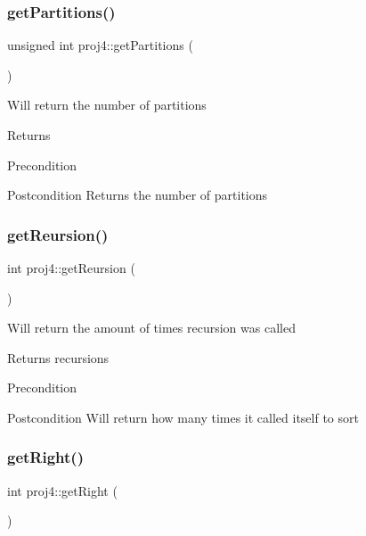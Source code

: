 \subsubsection{\texorpdfstring{get\+Partitions()}{getPartitions()}}
{\footnotesize\ttfamily unsigned int proj4\+::get\+Partitions (\begin{DoxyParamCaption}{ }\end{DoxyParamCaption})}

Will return the number of partitions \begin{DoxyReturn}{Returns}

\end{DoxyReturn}
\begin{DoxyPrecond}{Precondition}

\end{DoxyPrecond}
\begin{DoxyPostcond}{Postcondition}
Returns the number of partitions 
\end{DoxyPostcond}
\mbox{\label{classproj4_a3ba29a2c458a27e34577ef383bcf7df2}} 
\subsubsection{\texorpdfstring{get\+Reursion()}{getReursion()}}
{\footnotesize\ttfamily int proj4\+::get\+Reursion (\begin{DoxyParamCaption}{ }\end{DoxyParamCaption})}

Will return the amount of times recursion was called \begin{DoxyReturn}{Returns}
recursions 
\end{DoxyReturn}
\begin{DoxyPrecond}{Precondition}

\end{DoxyPrecond}
\begin{DoxyPostcond}{Postcondition}
Will return how many times it called itself to sort 
\end{DoxyPostcond}
\mbox{\label{classproj4_a83d1387e419d934fa5b97e2f79b979d2}} 
\subsubsection{\texorpdfstring{get\+Right()}{getRight()}}
{\footnotesize\ttfamily int proj4\+::get\+Right (\begin{DoxyParamCaption}{ }\end{DoxyParamCaption})}


